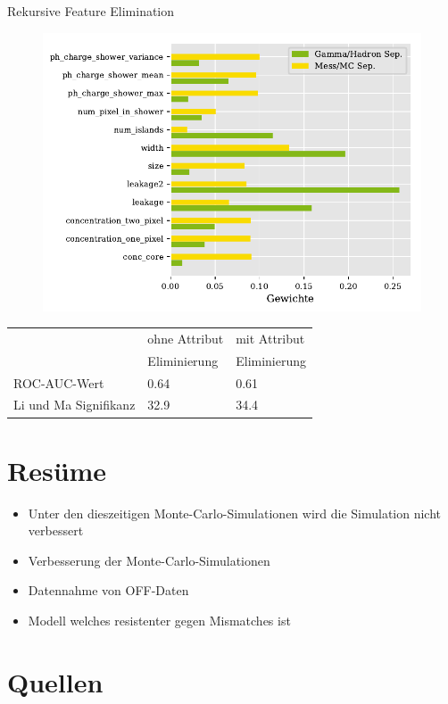 \documentclass[aspectratio=1610, professionalfonts, 9pt]{beamer}
\begin{document}
\begin{frame}{Rekursive Feature Elimination}
  \begin{figure}
	\centering
	\includegraphics[height=0.8\textheight]{./Plots/feature_elemination.pdf}
  \end{figure}
\end{frame}

\begin{frame}
  \begin{table}
	\centering
	\begin{tabular}{l s s}
	  \toprule
	  & ohne Attribut & mit Attribut \\
	  & Eliminierung  & Eliminierung \\
	  \cmidrule(r){2-3}
	  ROC-AUC-Wert            & \num{0.64} & \num{0.61} \\
	  Li und Ma Signifikanz   & \SI{32.9}{\sigma} & \SI{34.4}{\sigma} \\
	  \bottomrule
	\end{tabular}
  \end{table}
\end{frame}

\section{Resüme}
\begin{frame}
  \begin{itemize}
	\item<1-> Unter den dieszeitigen Monte-Carlo-Simulationen wird die Simulation nicht verbessert 
	\item<2-> Verbesserung der Monte-Carlo-Simulationen 
	\item<3-> Datennahme von OFF-Daten
	\item<4-> Modell welches resistenter gegen Mismatches ist
  \end{itemize}
\end{frame}

\section{Quellen}
\begin{frame}
  \printbibliography
\end{frame}
\end{document}
